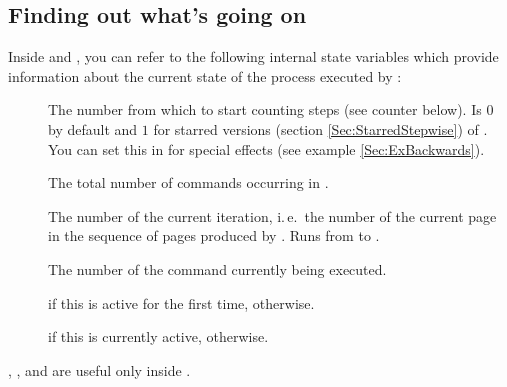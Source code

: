 \documentclass[12pt]{scrartcl}
\let\newslide=\relax
\begin{document}
  \subsection{Finding out what's going on}\label{Sec:Internals}%
  Inside  and , you can refer to the following internal state variables which provide
  information about the current state of the process executed by :
  \begin{description}
  \item[]
    The number from which to start counting steps (see counter 
    below). Is $0$ by default and $1$ for starred versions (section \ref{Sec:StarredStepwise}) of .
    You can set this in  for special effects (see example \ref{Sec:ExBackwards}).

  \item[]
    The total number of  commands occurring in .

    \newslide

  \item[]
    The number of the current iteration, i.\,e.\ the number of the current page in
    the sequence of pages produced by . Runs from  to
    .

  \item[]
    The number of the  command currently being executed.

  \item[]
     if this  is active for the first time,
     otherwise.

  \item[]
     if this  is currently active, 
    otherwise.
  \end{description}
  , , and  are useful only inside .


  \newslide
\end{document}
